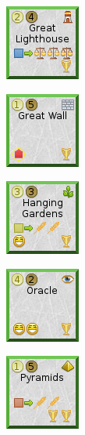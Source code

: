 \documentclass{article}
\begin{document}
\begin{figure}
  \begin{subfigure}{}
    \includegraphics[scale=1]{../rules/png/doe_wonder_great_lighthouse.png}
  \end{subfigure}
  \begin{subfigure}{}
    \includegraphics[scale=1]{../rules/png/doe_wonder_great_wall.png}
  \end{subfigure}
  \begin{subfigure}{}
    \includegraphics[scale=1]{../rules/png/doe_wonder_hanging_gardens.png}
  \end{subfigure}
  \begin{subfigure}{}
    \includegraphics[scale=1]{../rules/png/doe_wonder_oracle.png}
  \end{subfigure}
  \begin{subfigure}{}
    \includegraphics[scale=1]{../rules/png/doe_wonder_pyramids.png}
  \end{subfigure}
\end{figure}
\end{document}

